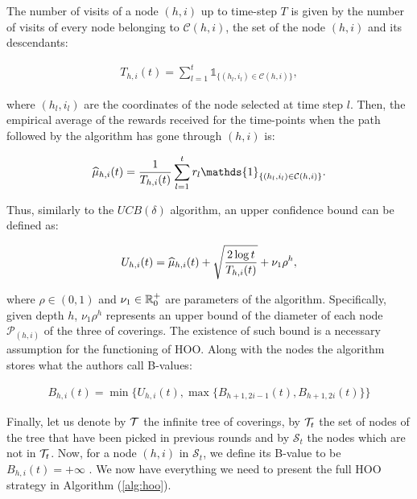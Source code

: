 The number of visits of a node $(h,i)$ up to time-step $T$ is given by the number of visits of every node belonging to $\mathcal{C}(h,i)$, \ie the set of the node $(h,i)$ and its descendants:

\begin{align}
T_{h,i}(t) = \sum_{l=1}^{t}\mathds{1}_{\{(h_l, i_l)\in\mathcal{C}(h,i)\}},
\end{align}

where $(h_l, i_l)$ are the coordinates of the node selected at time step $l$. Then, the empirical average of the rewards received for the time-points when the path followed by the algorithm has gone through $(h,i)$ is:

\begin{align}
\wh{\mu}_{h,i}(t) = \frac{1}{T_{h,i}(t)}\sum_{l=1}^{t}r_l\mathds{1}_{\{(h_l, i_l)\in\mathcal{C}(h,i)\}}.
\end{align}

Thus, similarly to the $UCB(\delta)$ algorithm, an upper confidence bound can be defined as:

\begin{align}
U_{h,i}(t) = \widehat{\mu}_{h,i}(t) + \sqrt{\frac{2\log{t}}{T_{h,i}(t)}} + \nu_1\rho^h,
\end{align}

where $\rho\in(0,1)$ and $\nu_1\in\mathbb{R}^+_0$ are parameters of the algorithm. Specifically, given depth $h$, $\nu_1\rho^h$ represents an upper bound of the diameter of each node $\mathcal{P}_{(h, i)}$ of the three of coverings. The existence of such bound is a necessary assumption for the functioning of \gls{HOO}. Along with the nodes the algorithm stores what the authors call B-values:

\begin{align}
B_{h,i}(t) = \min\{U_{h,i}(t), \max\{B_{h+1,2i-1}(t), B_{h+1,2i}(t)\}\}
\end{align}

Finally, let us denote by $\mathcal{T}$ the infinite tree of coverings, by $\mathcal{T}_t$ the set of nodes of the tree that have been picked in previous rounds and by $\mathcal{S}_t$ the nodes which are not in $\mathcal{T}_t$. Now, for a node $(h,i)$ in $\mathcal{S}_t$, we define
its B-value to be $B_{h,i}(t)=+\infty$ . We now have everything we need to present the full \gls{HOO} strategy in Algorithm (\ref{alg:hoo}).

